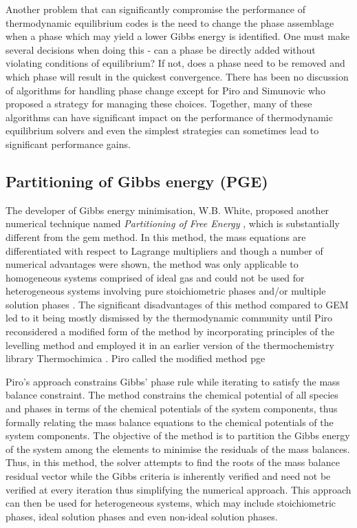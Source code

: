     Another problem that can significantly compromise the performance of thermodynamic equilibrium codes is the need to change the phase assemblage when a phase which may yield a lower Gibbs energy is identified. 
    One must make several decisions when doing this - can a phase be directly added without violating conditions of equilibrium? If not, does a phase need to be removed and which phase will result in the quickest convergence. There has been no discussion of algorithms for handling phase change except for Piro and Simunovic \cite{Piro12a} who proposed a strategy for managing these choices.  Together, many of these algorithms can have significant impact on the performance of thermodynamic equilibrium solvers and even the simplest strategies can sometimes lead to significant performance gains.

	\subsection{Partitioning of Gibbs energy (PGE)}
	The developer of Gibbs energy minimisation, W.B. White, proposed another numerical technique named \emph{Partitioning of Free Energy}  \cite{White67}, which is substantially different from the \gls{gem} method. In this method, the mass equations are differentiated with respect to Lagrange multipliers and though a number of numerical advantages were shown, the method was only applicable to homogeneous systems comprised of ideal gas and could not be used for heterogeneous systems involving pure stoichiometric phases and/or multiple solution phases \cite{White67,vanZeggeren11}. The significant disadvantages of this method compared to GEM led to it being mostly dismissed by the thermodynamic community until Piro \cite{Piro11b} reconsidered a modified form of the method by incorporating principles of the levelling method and employed it in an earlier version  of the thermochemistry library {Thermochimica} \cite{Piro13}. Piro called the modified method \gls{pge}

	Piro's approach \cite{Piro13} constrains  Gibbs' phase rule  while iterating to satisfy the mass balance constraint. The method constrains the chemical potential of all species and phases in terms of the chemical potentials of the system components, thus formally relating the mass balance equations to the chemical potentials of the system components. The objective of the method is to partition the Gibbs energy of the system among the elements to minimise the residuals of the mass balances. Thus, in this method, the solver attempts to find the roots of the mass balance residual vector while the Gibbs criteria is inherently verified and need not be verified at every iteration thus simplifying the numerical approach. This approach can then be used for heterogeneous systems, which may include stoichiometric phases, ideal solution phases and even non-ideal solution phases.

